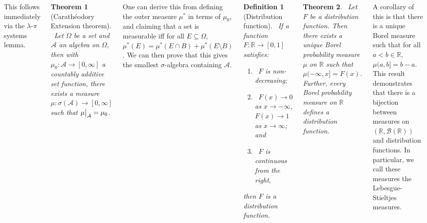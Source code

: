 \documentclass{tikzposter} %
\newcommand\restr[2]{{%
  \left.\kern-\nulldelimiterspace %
  #1 %
  \vphantom{\big|} %
  \right|_{#2} %
  }}
\newcommand\leftopen[2]{\ensuremath{(#1,#2]}}
\newtheorem{theorem}{Theorem}
\newtheorem{definition}{Definition}
\begin{document}
\begin{columns}
{{      This follows immediately via the $\lambda$-$\pi$ systems lemma. \\

     \begin{theorem}[Carath\'{e}odory Extension theorem]
    \ Let $\Omega$ be a set and $\mathcal{A}$ an algebra on $\Omega$, then with $\mu_{0} : \mathcal{A} \to [0,\infty]$ a countably additive set function, there exists a measure $\mu : \sigma(\mathcal{A}) \to [0,\infty]$ such that $\restr{\mu}{\mathcal{A}} = \mu_{0}$.
    \end{theorem}
    \hphantom{}

    One can derive this from defining the outer measure $\mu^{*}$ in terms of $\mu_{0}$, and claiming that a set is measurable iff for all $E \subseteq \Omega$, $\mu^{*}(E) = \mu^{*}(E \cap B) + \mu^{*}(E \setminus B)$. We can then prove that this gives the smallest $\sigma$-algebra containing $\mathcal{A}$.
    }
    \hphantom{}

    \begin{definition}[Distribution function]
    \ If a function $F : \mathbb{R} \to [0,1]$ satisfies:
    \begin{enumerate}[label=\roman*.]
          \item \ $F$ is non-decreasing;
          \item \ $F(x) \to 0$ as $x \to -\infty$, $F(x) \to 1$ as $x \to \infty$; and
            \item \ $F$ is continuous from the right,
    \end{enumerate}
    then $F$ is a distribution function.
    \end{definition}
    \hphantom{}

    \begin{theorem}
    \ Let $F$ be a distribution function. Then there exists a unique Borel probability measure $\mu$ on $\mathbb{R}$ such that $\mu\leftopen{-\infty}{x} = F(x)$. Further, every Borel probability measure on $\mathbb{R}$ defines a distribution function.
    \end{theorem}
    \hphantom{}

    A corollary of this is that there is a unique Borel measure such that for all $a < b \in \mathbb{R}$, $\mu\leftopen{a}{b} = b-a$. \\

    This result demonstrates that there is a bijection between measures on $(\mathbb{R}, \mathcal{B}(\mathbb{R}))$ and distribution functions. In particular, we call these measures the Lebesgue-Stieltjes measures. \\

}
\end{columns}
\end{document}
